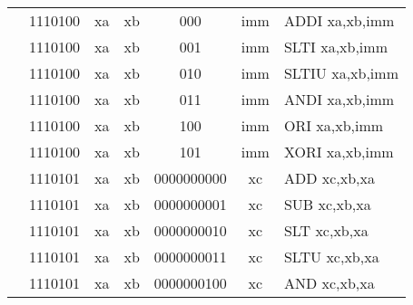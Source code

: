 \begin{table}[p]
\begin{small}
\begin{center}
\begin{tabular}{rcccccccccl}
&
\multicolumn{2}{|c|}{1110100} &
\multicolumn{1}{c|}{xa} &
\multicolumn{1}{c|}{xb} &
\multicolumn{1}{c|}{000} &
\multicolumn{4}{c|}{imm} & ADDI xa,xb,imm \\
\cline{2-10}
  

&
\multicolumn{2}{|c|}{1110100} &
\multicolumn{1}{c|}{xa} &
\multicolumn{1}{c|}{xb} &
\multicolumn{1}{c|}{001} &
\multicolumn{4}{c|}{imm} & SLTI xa,xb,imm \\
\cline{2-10}
  

&
\multicolumn{2}{|c|}{1110100} &
\multicolumn{1}{c|}{xa} &
\multicolumn{1}{c|}{xb} &
\multicolumn{1}{c|}{010} &
\multicolumn{4}{c|}{imm} & SLTIU xa,xb,imm \\
\cline{2-10}
  

&
\multicolumn{2}{|c|}{1110100} &
\multicolumn{1}{c|}{xa} &
\multicolumn{1}{c|}{xb} &
\multicolumn{1}{c|}{011} &
\multicolumn{4}{c|}{imm} & ANDI xa,xb,imm \\
\cline{2-10}
  

&
\multicolumn{2}{|c|}{1110100} &
\multicolumn{1}{c|}{xa} &
\multicolumn{1}{c|}{xb} &
\multicolumn{1}{c|}{100} &
\multicolumn{4}{c|}{imm} & ORI xa,xb,imm \\
\cline{2-10}
  

&
\multicolumn{2}{|c|}{1110100} &
\multicolumn{1}{c|}{xa} &
\multicolumn{1}{c|}{xb} &
\multicolumn{1}{c|}{101} &
\multicolumn{4}{c|}{imm} & XORI xa,xb,imm \\
\cline{2-10}
  

&
\multicolumn{2}{|c|}{1110101} &
\multicolumn{1}{c|}{xa} &
\multicolumn{1}{c|}{xb} &
\multicolumn{4}{c|}{0000000000} &
\multicolumn{1}{c|}{xc} & ADD xc,xb,xa \\
\cline{2-10}
  

&
\multicolumn{2}{|c|}{1110101} &
\multicolumn{1}{c|}{xa} &
\multicolumn{1}{c|}{xb} &
\multicolumn{4}{c|}{0000000001} &
\multicolumn{1}{c|}{xc} & SUB xc,xb,xa \\
\cline{2-10}
  

&
\multicolumn{2}{|c|}{1110101} &
\multicolumn{1}{c|}{xa} &
\multicolumn{1}{c|}{xb} &
\multicolumn{4}{c|}{0000000010} &
\multicolumn{1}{c|}{xc} & SLT xc,xb,xa \\
\cline{2-10}
  

&
\multicolumn{2}{|c|}{1110101} &
\multicolumn{1}{c|}{xa} &
\multicolumn{1}{c|}{xb} &
\multicolumn{4}{c|}{0000000011} &
\multicolumn{1}{c|}{xc} & SLTU xc,xb,xa \\
\cline{2-10}
  

&
\multicolumn{2}{|c|}{1110101} &
\multicolumn{1}{c|}{xa} &
\multicolumn{1}{c|}{xb} &
\multicolumn{4}{c|}{0000000100} &
\multicolumn{1}{c|}{xc} & AND xc,xb,xa \\
\cline{2-10}
  


\end{tabular}
\end{center}
\end{small}
\end{table}
